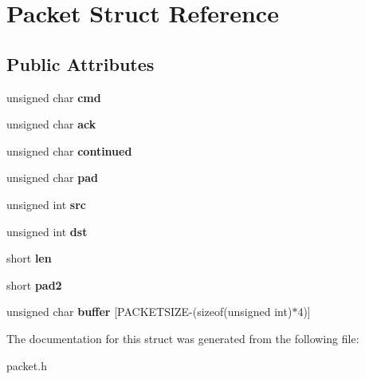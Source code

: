 \hypertarget{structPacket}{
\section{Packet Struct Reference}
\label{structPacket}
}
\subsection*{Public Attributes}
\begin{DoxyCompactItemize}
\item 
\hypertarget{structPacket_a0349cdfc3c1b8c96a63d3b777debf7d7}{
unsigned char {\bfseries cmd}}
\label{structPacket_a0349cdfc3c1b8c96a63d3b777debf7d7}

\item 
\hypertarget{structPacket_a9d74ad55b7bb41c148abfb5ed3792fb6}{
unsigned char {\bfseries ack}}
\label{structPacket_a9d74ad55b7bb41c148abfb5ed3792fb6}

\item 
\hypertarget{structPacket_a45cd7fcf87da501cc5c4867ef8aa39d1}{
unsigned char {\bfseries continued}}
\label{structPacket_a45cd7fcf87da501cc5c4867ef8aa39d1}

\item 
\hypertarget{structPacket_a55e9b0d6d167df7170d8f1bfc8212192}{
unsigned char {\bfseries pad}}
\label{structPacket_a55e9b0d6d167df7170d8f1bfc8212192}

\item 
\hypertarget{structPacket_acf72a82d74f8d3f137aeea6901db0ba1}{
unsigned int {\bfseries src}}
\label{structPacket_acf72a82d74f8d3f137aeea6901db0ba1}

\item 
\hypertarget{structPacket_a4ec560f9aacfd119386a1dcca7ab9ca9}{
unsigned int {\bfseries dst}}
\label{structPacket_a4ec560f9aacfd119386a1dcca7ab9ca9}

\item 
\hypertarget{structPacket_a0ded3c02c0b91419e5659c6121811fac}{
short {\bfseries len}}
\label{structPacket_a0ded3c02c0b91419e5659c6121811fac}

\item 
\hypertarget{structPacket_a84e2eb398f727a7a275b4a6aa4c07744}{
short {\bfseries pad2}}
\label{structPacket_a84e2eb398f727a7a275b4a6aa4c07744}

\item 
\hypertarget{structPacket_a739d898c0b7f0d97f55a5ef0cb89afdc}{
unsigned char {\bfseries buffer} \mbox{[}PACKETSIZE-\/(sizeof(unsigned int)$\ast$4)\mbox{]}}
\label{structPacket_a739d898c0b7f0d97f55a5ef0cb89afdc}

\end{DoxyCompactItemize}


The documentation for this struct was generated from the following file:\begin{DoxyCompactItemize}
\item 
packet.h\end{DoxyCompactItemize}
